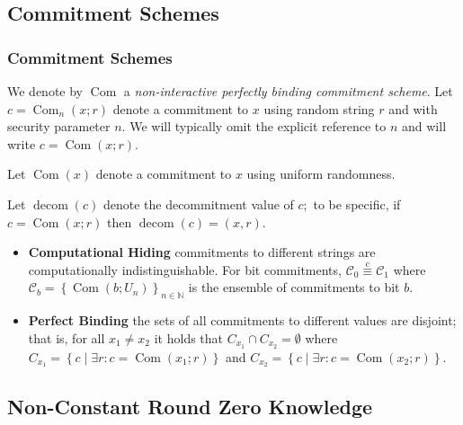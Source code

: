 \documentclass{beamer}
\begin{document}
    \subsection{Commitment Schemes}
    \begin{frame}
        \frametitle{Commitment Schemes}
        \begin{definition}
            We denote by $\operatorname{Com}$ a \emph{non-interactive perfectly binding commitment scheme}. Let $c=\operatorname{Com}_{n}(x ; r)$ denote a commitment to $x$ using random string $r$ and with security parameter $n .$ We will typically omit the explicit reference to $n$ and will write $c=\operatorname{Com}(x ; r) .$ 
            
            Let $\operatorname{Com}(x)$ denote a commitment to $x$ using uniform randomness. 
            
            Let $\operatorname{decom}(c)$ denote the decommitment value of $c ;$ to be specific, if $c=\operatorname{Com}(x ; r)$ then $\operatorname{decom}(c)=(x, r)$.
            \begin{itemize}
                \item \textbf{Computational Hiding} commitments to different strings are computationally indistinguishable. For bit commitments,  $\mathcal{C}_{0} \stackrel{\mathrm{c}}{\equiv} \mathcal{C}_{1}$ where $\mathcal{C}_{b}=\left\{\operatorname{Com}\left(b ; U_{n}\right)\right\}_{n \in \mathbb{N}}$ is the ensemble of commitments to bit $b$.
                \item \textbf{Perfect Binding} the sets of all commitments to different values are disjoint; that is, for all $x_{1} \neq x_{2}$ it holds that $C_{x_{1}} \cap C_{x_{2}}=\emptyset$ where $C_{x_{1}}=\left\{c \mid \exists r: c=\operatorname{Com}\left(x_{1} ; r\right)\right\}$
                and $C_{x_{2}}=\left\{c \mid \exists r: c=\operatorname{Com}\left(x_{2} ; r\right)\right\}$. 
            \end{itemize}
        \end{definition}
    
        
    
    \end{frame}
    \subsection{Non-Constant Round Zero Knowledge}
    \subsectionpage
\end{document}

